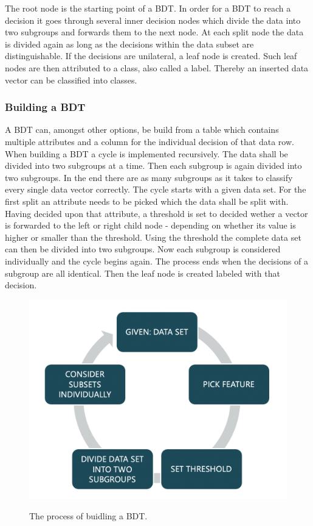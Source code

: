\documentclass[
12pt,
headsepline,
bibliography=totoc,
twoside=semi,
fleqn
]{scrartcl}
\begin{document}
      The root node is the starting point of a BDT. In order for a BDT to reach a decision it goes through several inner decision nodes which divide the data into two subgroups and forwards them to the next node. At each split node the data is divided again as long as the decisions within the data subset are distinguishable. If the decisions are unilateral, a leaf node is created. Such leaf nodes are then attributed to a class, also called a label. Thereby an inserted data vector can be classified into classes. 

    \subsubsection{Building a BDT\label{sec:sec2-1-2}}
      A BDT can, amongst other options, be build from a table which contains multiple attributes and a column for the individual decision of that data row. When building a BDT a cycle is implemented recursively. The data shall be divided into two subgroups at a time. Then each subgroup is again divided into two subgroups. In the end there are as many subgroups as it takes to classify every single data vector correctly. The cycle starts with a given data set. For the first split an attribute needs to be picked which the data shall be split with. Having decided upon that attribute, a threshold is set to decided wether a vector is forwarded to the left or right child node - depending on whether its value is higher or smaller than the threshold. Using the threshold the complete data set can then be divided into two subgroups. Now each subgroup is considered individually and the cycle begins again. The process ends when the decisions of a subgroup are all identical. Then the leaf node is created labeled with that decision.  

      \begin{figure}[H]
        \centering \includegraphics[scale=0.55]{BDT2.png}\label{fig:fig2}
        \caption{The process of buidling a BDT.}
      \end{figure}
\end{document}
